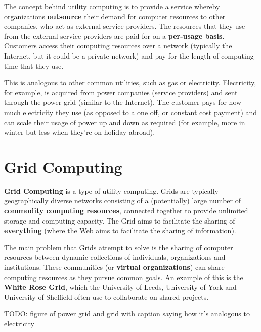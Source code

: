 \documentclass{article}
\begin{document}
The concept behind utility computing is to provide a service whereby organizations \textbf{outsource} their demand for computer resources to other companies, who act as external service providers. The resources that they use from the external service providers are paid for on a \textbf{per-usage basis}. Customers access their computing resources over a network (typically the Internet, but it could be a private network) and pay for the length of computing time that they use. 

This is analogous to other common utilities, such as gas or electricity. Electricity, for example, is acquired from power companies (service providers) and sent through the power grid (similar to the Internet). The customer pays for how much electricity they use (as opposed to a one off, or constant cost payment) and can scale their usage of power up and down as required (for example, more in winter but less when they're on holiday abroad).

\section{Grid Computing}
 
\textbf{Grid Computing} is a type of utility computing. Grids are typically geographically diverse networks consisting of a (potentially) large number of \textbf{commodity computing resources}, connected together to provide unlimited storage and computing capacity. The Grid aims to facilitate the sharing of \textbf{everything} (where the Web aims to facilitate the sharing of information). 

The main problem that Grids attempt to solve is the sharing of computer resources between dynamic collections of individuals, organizations and institutions. These communities (or \textbf{virtual organizations}) can share computing resources as they pursue common goals. An example of this is the \textbf{White Rose Grid}, which the University of Leeds, University of York and University of Sheffield often use to collaborate on shared projects.

TODO: figure of power grid and grid with caption saying how it's analogous to electricity
\end{document}
